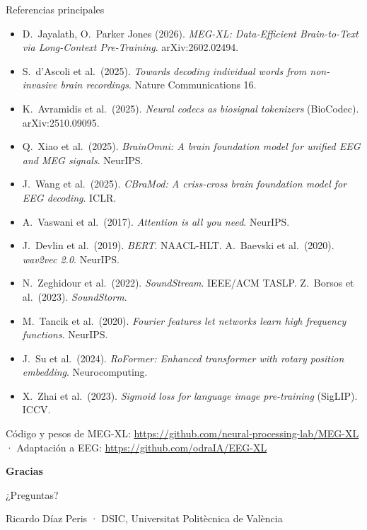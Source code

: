 \documentclass[aspectratio=169,10pt]{beamer}
\begin{document}
\begin{frame}[c]{Referencias principales}
  \footnotesize
  \begin{itemize}
    \item D.~Jayalath, O.~Parker Jones (2026). \emph{MEG-XL: Data-Efficient Brain-to-Text via Long-Context Pre-Training}. arXiv:2602.02494.
    \item S.~d'Ascoli et al.\ (2025). \emph{Towards decoding individual words from non-invasive brain recordings}. Nature Communications 16.
    \item K.~Avramidis et al.\ (2025). \emph{Neural codecs as biosignal tokenizers} (BioCodec). arXiv:2510.09095.
    \item Q.~Xiao et al.\ (2025). \emph{BrainOmni: A brain foundation model for unified EEG and MEG signals}. NeurIPS.
    \item J.~Wang et al.\ (2025). \emph{CBraMod: A criss-cross brain foundation model for EEG decoding}. ICLR.
    \item A.~Vaswani et al.\ (2017). \emph{Attention is all you need}. NeurIPS.
    \item J.~Devlin et al.\ (2019). \emph{BERT}. NAACL-HLT. \quad A.~Baevski et al.\ (2020). \emph{wav2vec 2.0}. NeurIPS.
    \item N.~Zeghidour et al.\ (2022). \emph{SoundStream}. IEEE/ACM TASLP. \quad Z.~Borsos et al.\ (2023). \emph{SoundStorm}.
    \item M.~Tancik et al.\ (2020). \emph{Fourier features let networks learn high frequency functions}. NeurIPS.
    \item J.~Su et al.\ (2024). \emph{RoFormer: Enhanced transformer with rotary position embedding}. Neurocomputing.
    \item X.~Zhai et al.\ (2023). \emph{Sigmoid loss for language image pre-training} (SigLIP). ICCV.
  \end{itemize}
  \vspace{2mm}
  {\scriptsize Código y pesos de MEG-XL: \url{https://github.com/neural-processing-lab/MEG-XL} \quad · \quad Adaptación a EEG: \url{https://github.com/odraIA/EEG-XL}}
\end{frame}

{
\begin{frame}[plain,c]
  \centering
  {\Huge\bfseries\color{white}Gracias\par}
  \vspace{6mm}
  {\large\color{white}¿Preguntas?\par}
  \vspace{12mm}
  {\small\color{white!85}Ricardo Díaz Peris · DSIC, Universitat Politècnica de València\par}
\end{frame}
}
\end{document}
